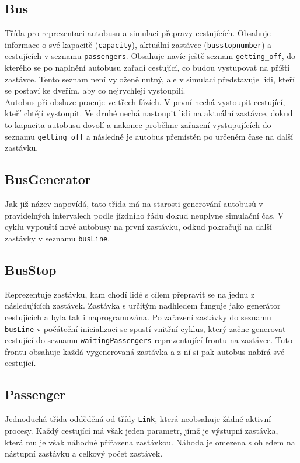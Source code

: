 \documentclass{article}
\begin{document}
		\subsection{Bus}
			Třída pro reprezentaci autobusu a simulaci přepravy cestujících. Obsahuje informace o své kapacitě (\verb|capacity|), aktuální zastávce (\verb|busstopnumber|) a cestujících v seznamu \verb|passengers|. Obsahuje navíc ještě seznam \verb|getting_off|, do kterého se po naplnění autobusu zařadí cestující, co budou vystupovat na příští zastávce. Tento seznam není vyloženě nutný, ale v simulaci představuje lidi, kteří se postaví ke dveřím, aby co nejrychleji vystoupili.\\
			Autobus při obsluze pracuje ve třech fázích. V první nechá vystoupit cestující, kteří chtějí vystoupit. Ve druhé nechá nastoupit lidi na aktuální zastávce, dokud to kapacita autobusu dovolí a nakonec proběhne zařazení vystupujících do seznamu \verb|getting_off| a následně je autobus přemístěn po určeném čase na další zastávku.
		\subsection{BusGenerator}
			Jak již název napovídá, tato třída má na starosti generování autobusů v pravidelných intervalech podle jízdního řádu dokud neuplyne simulační čas. V cyklu vypouští nové autobusy na první zastávku, odkud pokračují na další zastávky v seznamu \verb|busLine|.
		\subsection{BusStop}
			Reprezentuje zastávku, kam chodí lidé s cílem přepravit se na jednu z následujících zastávek. Zastávka s určitým nadhledem funguje jako generátor cestujících a byla tak i naprogramována. Po zařazení zastávky do seznamu \verb|busLine| v počáteční inicializaci se spustí vnitřní cyklus, který začne generovat cestující do seznamu \verb|waitingPassengers| reprezentující frontu na zastávce. Tuto frontu obsahuje každá vygenerovaná zastávka a z ní si pak autobus nabírá své cestující.
		\subsection{Passenger}
			Jednoduchá třída odděděná od třídy \verb|Link|, která neobsahuje žádné aktivní procesy. Každý cestující má však jeden parametr, jímž je výstupní zastávka, která mu je však náhodně přiřazena zastávkou. Náhoda je omezena s ohledem na nástupní zastávku a celkový počet zastávek.
\end{document}
